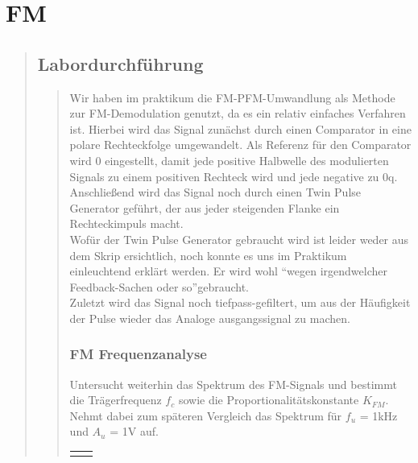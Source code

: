 \section{FM}
\begin{quote}
    
    
    \subsection{Labordurchführung}
    \begin{quote}
        
        Wir haben im praktikum die FM-PFM-Umwandlung als Methode zur FM-Demodulation genutzt, da es ein relativ einfaches
        Verfahren ist. Hierbei wird das Signal zunächst durch einen Comparator in eine polare Rechteckfolge umgewandelt. Als
        Referenz für den Comparator wird \si{0}{\volt} eingestellt, damit jede positive Halbwelle des modulierten Signals zu
        einem positiven Rechteck wird und jede negative zu \si{0}{\volt}q.\\
        Anschließend wird das Signal noch durch einen Twin Pulse Generator geführt, der aus jeder steigenden Flanke ein
        Rechteckimpuls macht.\\
        Wofür der Twin Pulse Generator gebraucht wird ist leider weder aus dem Skrip ersichtlich, noch konnte es uns im Praktikum
        einleuchtend erklärt werden. Er wird wohl ``wegen irgendwelcher Feedback-Sachen oder so''\footnotemark gebraucht.\\
        Zuletzt wird das Signal noch tiefpass-gefiltert, um aus der Häufigkeit der Pulse wieder das Analoge ausgangssignal zu
        machen.
        
        \subsubsection{FM Frequenzanalyse}
        Untersucht weiterhin das Spektrum des FM-Signals und bestimmt die Trägerfrequenz $f_c$ sowie die
        Proportionalitätskonstante $K_{FM}$. Nehmt dabei zum späteren Vergleich das Spektrum für $f_u$ = 1kHz und $A_u$ = 1V auf.
        
        
        \begin{center}
        \begin{tabular}{ll}
        
        \hspace{-3.3cm}
            \begin{minipage}{0.6\textwidth}
                

\end{minipage}
\end{tabular}
\end{center}
\end{quote}
\end{quote}
